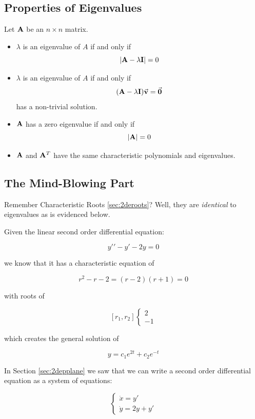     \subsection{Properties of Eigenvalues}
    Let $\mathbf{A}$ be an $n \times n$ matrix.

        \begin{itemize}
            \item $\lambda$ is an eigenvalue of $A$ if and only if
                \[ | \mathbf{A} - \lambda \mathbf{I} | = 0 \]
            \item $\lambda$ is an eigenvalue of $A$ if and only if
                \[ ( \ma - \lambda \mathbf{I}) \vec{v} = \vec{0} \]
                has a non-trivial solution.
            \item $\mathbf{A}$ has a zero eigenvalue if and only if
                \[ | \mathbf{A} | = 0 \]
            \item $\mathbf{A}$ and $\mathbf{A}^T$ have the same characteristic polynomials and eigenvalues.
        \end{itemize}

    \subsection{The Mind-Blowing Part}
    Remember Characteristic Roots \eqref{sec:2deroots}? Well, they are \textit{identical} to eigenvalues as is evidenced below.

     Given the linear second order differential equation:

        \[ y\prime\prime - y \prime - 2y = 0 \]

    we know that it has a characteristic equation of

        \[ r^2 - r - 2 = (r - 2)(r + 1) = 0 \]

    with roots of

        \[
            [r_1, r_2]
            \begin{cases}
                2\\
                -1
            \end{cases}
        \]

    which creates the general solution of

        \[ y = c_1 e^{2t} + c_2 e^{-t} \]

    In Section \ref{sec:2depplane} we saw that we can write a second order differential equation as a system of equations:

        \[ \begin{cases}
            \dot{x} = y\prime\\
            \dot{y} = 2y + y\prime
        \end{cases} \]

